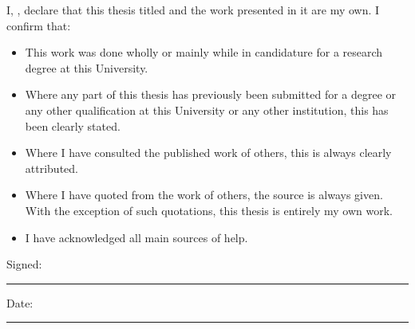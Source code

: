\noindent I, \authorname, declare that this thesis titled \textit{\ttitle} and the work presented in it are my own. I confirm that:

\begin{itemize}
  \item This work was done wholly or mainly while in candidature for a research degree at this University.
  \item Where any part of this thesis has previously been submitted for a degree or any other qualification at this University or any other institution, this has been clearly stated.
  \item Where I have consulted the published work of others, this is always clearly attributed.
  \item Where I have quoted from the work of others, the source is always given. With the exception of such quotations, this thesis is entirely my own work.
  \item I have acknowledged all main sources of help.
\end{itemize}

\noindent Signed:\\
\rule[0.5em]{25em}{0.5pt}

\noindent Date:\\
\rule[0.5em]{25em}{0.5pt}
